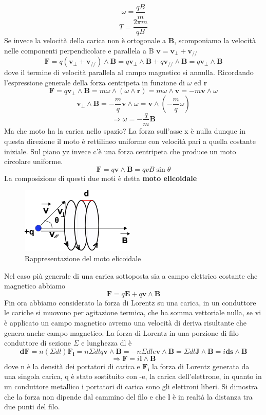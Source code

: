 \documentclass[
10pt, %
a4paper, %
oneside, %
headinclude,footinclude, %
BCOR5mm, %
]{scrartcl}
\begin{document}
\[\omega=\frac{qB}{m}\]
\[T=\frac{2\pi m }{qB}\]
Se invece la velocità della carica non è ortogonale a $\mathbf{B}$, scomponiamo la velocità nelle componenti perpendicolare e parallela a B \(\mathbf{v}=\mathbf{v}_{\perp}+\mathbf{v_{//}}\)
\[\mathbf{F} = q(\mathbf{v}_{\perp}+\mathbf{v_{//}})\wedge \mathbf{B}=q\mathbf{v}_{\perp}\wedge \mathbf{B}+q\mathbf{v_{//}}\wedge \mathbf{B}= q\mathbf{v}_{\perp}\wedge \mathbf{B} \] 
dove il termine di velocità parallela al campo magnetico si annulla. Ricordando l'espressione generale della forza centripeta in funzione di $\omega$ ed $\mathbf{r}$
\[\mathbf{F}= q\mathbf{v}_{\perp}\wedge \mathbf{B}= m \omega\wedge(\omega\wedge\mathbf{r})= m\omega\wedge\mathbf{v}= -m\mathbf{v}\wedge\omega \] 
\[\mathbf{v_{\perp}}\wedge \mathbf{B}= -\frac{m}{q}\mathbf{v}\wedge\omega =\mathbf{v}\wedge\left(-\frac{m}{q}\omega\right) \]
\[\Rightarrow \omega= -\frac{q}{m}\mathbf{B}\]
Ma che moto ha la carica nello spazio? La forza sull'asse x è nulla dunque in questa direzione il moto è rettilineo uniforme con velocità pari a quella costante iniziale. Sul piano yz invece c'è una forza centripeta che produce un moto circolare uniforme.
\[\mathbf{F}= q\mathbf{v}\wedge\mathbf{B}= qvB\sin\theta\]
La composizione di questi due moti è detta \textbf{moto elicoidale}
\begin{figure}[h!]
	\centering
	\includegraphics[width=0.5\linewidth]{../images/moto_elicoidale}
	\caption{Rappresentazione del moto elicoidale}
	\label{fig:motoelicoidale}
\end{figure}
\FloatBarrier
Nel caso più generale di una carica sottoposta sia a campo elettrico costante che magnetico abbiamo
\[\mathbf{F}= q\mathbf{E}+q\mathbf{v}\wedge\mathbf{B}\]
Fin ora abbiamo considerato la forza di Lorentz su una carica, in un conduttore le cariche si muovono per agitazione termica, che ha somma vettoriale nulla, se vi è applicato un campo magnetico avremo una velocità di deriva risultante che genera anche campo magnetico. La forza di Lorentz in una porzione di filo conduttore di sezione $\Sigma$ e lunghezza dl è
\[\mathbf{dF}=n(\Sigma dl)\mathbf{F_i} = n\Sigma dl q\mathbf{v}\wedge\mathbf{B}= -n\Sigma dl e\mathbf{v}\wedge\mathbf{B} = \Sigma dl \mathbf{J}\wedge\mathbf{B}= i\mathbf{ds}\wedge\mathbf{B}\]  
\[\Rightarrow \mathbf{F}=i\mathbf{l}\wedge\mathbf{B}\]
dove n è la densità dei portatori di carica e \(\mathbf{F_i}\) la forza di Lorentz generata da una singola carica, q è stato sostituito con -e, la carica dell'elettrone, in quanto in un conduttore metallico i portatori di carica sono gli elettroni liberi. Si dimostra che la forza non dipende dal cammino del filo e che $\mathbf{l}$ è in realtà la distanza tra due punti del filo.  
\end{document}
